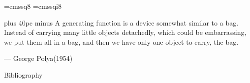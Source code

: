 \documentclass[aspectratio=169]{beamer}
\begin{document}

\font\eightss=cmssq8
\font\eightssi=cmssqi8
\newcommand\quoteAuthorDate[3]{\begingroup
  \baselineskip 10pt
  \parfillskip 0pt
  \interlinepenalty 10000 %
  \leftskip 0pt plus 40pc minus \parindent
  \let\rm=\eightss
  \let\sl=\eightssi
  \everypar{\sl}#1\par
  \nobreak\smallskip
  \noindent\rm--- #2\unskip\enspace(#3)\par
  \endgroup}
\begin{frame}
    \begin{center}
        \item \quoteAuthorDate{A generating function is a device somewhat similar to a bag. Instead of carrying many little objects detachedly, which could be embarrassing, we put them all in a bag, and then we have only one object to carry, the bag.}{George Polya}{\textcolor{sigma@mainblue}{1954}}
    \end{center}
\end{frame}

\begin{frame}[allowframebreaks]{Bibliography}
    \tiny
    
    
    
    \nocite{algoanalysis, ac, gfology, MITNotes, gasarch2014ways}
    
\end{frame}

\end{document}
